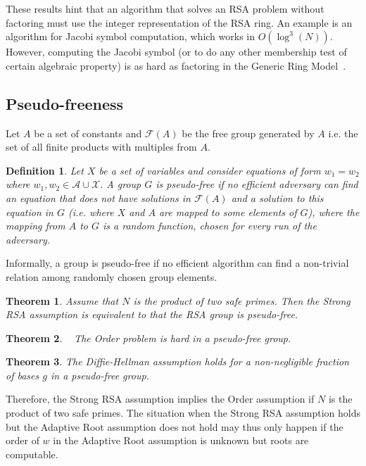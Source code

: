 \documentclass[a4paper]{article}
\newtheorem{definition}{Definition}
\newtheorem{theorem}{Theorem}
\begin{document}
These results hint that an algorithm that solves an RSA problem without factoring must use the integer representation of the RSA ring. An example is an algorithm for Jacobi symbol computation, which works in $O(\log^3(N))$. However, computing the Jacobi symbol (or to do any other membership test of certain algebraic property) is as hard as factoring in the Generic Ring Model~\cite{DBLP:journals/joc/JagerS13}.


\subsection{Pseudo-freeness}

Let $A$ be a set of constants and $\mathcal{F}(A)$ be the free group generated by $A$ i.e. the set of all finite products with multiples from $A$. 
\begin{definition}Let $X$ be a set of variables and consider equations of form $w_1 = w_2$ where $w_1,w_2\in\mathcal{A\cup X}$. A group $G$ is \emph{pseudo-free} if no efficient adversary can find an equation that does not have solutions in $\mathcal{F}(A)$ and a solution to this equation in $G$ (i.e. where $X$ and $A$ are mapped to some elements of $G$), where the mapping from $A$ to $G$ is a random function, chosen for every run of the adversary.
\end{definition}

Informally, a group is pseudo-free if no efficient algorithm can find a non-trivial relation among randomly chosen group elements.

\begin{theorem}\cite{DBLP:conf/tcc/Rivest04,DBLP:conf/eurocrypt/Micciancio05}
Assume that $N$ is the product of two safe primes. Then the Strong RSA assumption is equivalent to that the RSA group is pseudo-free.
\end{theorem}

\begin{theorem}~\cite{DBLP:conf/tcc/Rivest04} The Order problem is hard in a pseudo-free group.
\end{theorem}

\begin{theorem}\cite{DBLP:journals/ijisec/HasegawaIST09}
The Diffie-Hellman assumption holds for a non-negligible fraction of bases $g$ in a pseudo-free group.
\end{theorem}

Therefore, the Strong RSA assumption implies the Order assumption if $N$ is the product of two safe primes. The situation when the Strong RSA assumption holds but the Adaptive Root assumption does not hold may thus only happen if the order of $w$ in the Adaptive Root assumption is unknown but roots are computable. 
\end{document}
